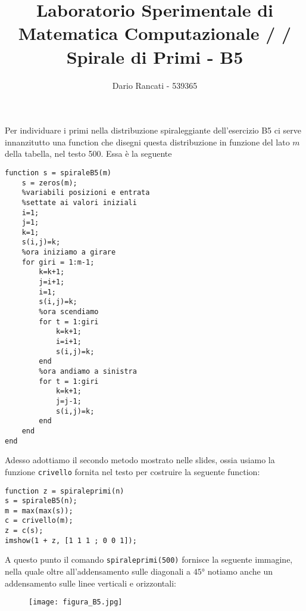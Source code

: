 \documentclass{article}
\title{\textbf{Laboratorio Sperimentale di Matematica Computazionale / / Spirale di Primi - B5}}
\author{Dario Rancati - 539365}
\begin{document}
\maketitle

\noindent
Per individuare i primi nella distribuzione spiraleggiante dell'esercizio B5 ci serve innanzitutto una function che disegni questa distribuzione in funzione del lato $m$ della tabella, nel testo 500. Essa è la seguente

\begin{lstlisting}
function s = spiraleB5(m)
    s = zeros(m);
    %variabili posizioni e entrata 
    %settate ai valori iniziali
    i=1;
    j=1;
    k=1;
    s(i,j)=k;
    %ora iniziamo a girare
    for giri = 1:m-1;
        k=k+1;
        j=i+1;
        i=1;
        s(i,j)=k;
        %ora scendiamo
        for t = 1:giri
            k=k+1;
            i=i+1;
            s(i,j)=k;
        end
        %ora andiamo a sinistra
        for t = 1:giri
            k=k+1;
            j=j-1;
            s(i,j)=k;
        end    
    end
end   
\end{lstlisting}

\noindent
Adesso adottiamo il secondo metodo mostrato nelle slides, ossia usiamo la funzione \texttt{crivello} fornita nel testo per costruire la seguente function:

\begin{lstlisting}
function z = spiraleprimi(n)
s = spiraleB5(n);
m = max(max(s));
c = crivello(m);
z = c(s);
imshow(1 + z, [1 1 1 ; 0 0 1]);
\end{lstlisting}
\noindent
A questo punto il comando \texttt{spiraleprimi(500)} fornisce la seguente immagine, nella quale oltre all'addensamento sulle diagonali a $45°$ notiamo anche un addensamento sulle linee verticali e orizzontali:
\begin{figure}[h!]
\centering
\texttt{[image: figura\_B5.jpg]}
\end{figure}
\end{document}
